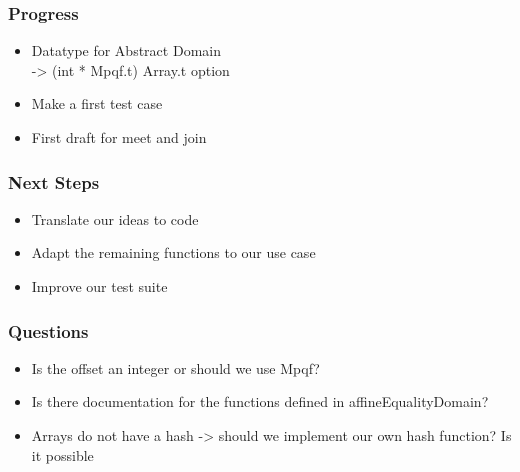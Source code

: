 \documentclass[english,xcolor=table]{i20lecture}
\subtitle{Relational Domains}
\begin{document}

\frame{\titlepage}



\begin{frame}
	\frametitle{Progress}
		\begin{itemize}
			\item Datatype for Abstract Domain\\-> (int * Mpqf.t) Array.t option
			\item Make a first test case
			\item First draft for meet and join
		\end{itemize}
\end{frame}

\begin{frame}
	\frametitle{Next Steps}
	\begin{itemize}
		\item Translate our ideas to code
		\item Adapt the remaining functions to our use case
		\item Improve our test suite
	\end{itemize}
\end{frame}

\begin{frame}
	\frametitle{Questions}
	\begin{itemize}
		\item Is the offset an integer or should we use Mpqf?
		\item Is there documentation for the functions defined in affineEqualityDomain?
		\item Arrays do not have a hash -> should we implement our own hash function? Is it possible
	\end{itemize}
\end{frame}
\end{document}
